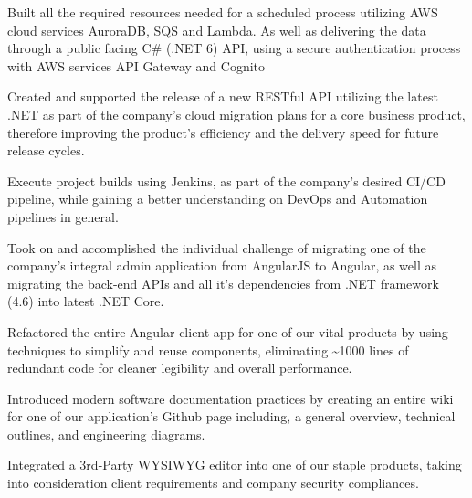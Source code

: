 \documentclass[]{deedy-resume}
\begin{document}
\vspace{\topsep} %
\begin{tightemize}
\item Built all the required resources needed for a scheduled process utilizing AWS cloud services AuroraDB, SQS and Lambda. As well as delivering the data through a public facing C\# (.NET 6) API,  using a secure authentication process with AWS services API Gateway and Cognito
\item Created and supported the release of a new RESTful API utilizing the latest .NET as part of the company's cloud migration plans for a core business product, therefore improving the product's efficiency and the delivery speed for future release cycles.
\item Execute project builds using Jenkins, as part of the company's desired CI/CD pipeline, while gaining a better understanding on DevOps and Automation pipelines in general. 
\end{tightemize}
\sectionsep

\begin{tightemize}
\item Took on and accomplished the individual challenge of migrating one of the company's integral admin application from AngularJS to Angular, as well as migrating the back-end APIs and all it's dependencies from .NET framework (4.6) into latest .NET Core.
\item Refactored the entire Angular client app for one of our vital products by using techniques to simplify and reuse components, eliminating \textasciitilde1000 lines of redundant code for cleaner legibility and overall performance.
\item Introduced modern software documentation practices by creating an entire wiki for one of our application's Github page including, a general overview, technical outlines, and engineering diagrams.
\item Integrated a 3rd-Party WYSIWYG editor into one of our staple products, taking into consideration client requirements and company security compliances.
\end{tightemize}
\sectionsep
\end{document}
